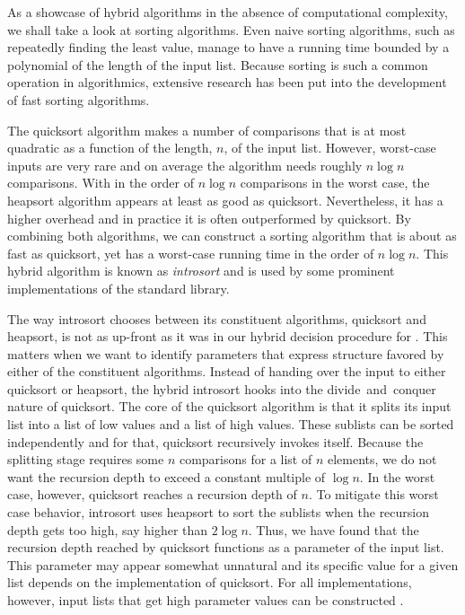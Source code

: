 \begin{example}
  As a showcase of hybrid algorithms in the absence of computational complexity, we shall take a look at sorting algorithms.
  Even naive sorting algorithms, such as repeatedly finding the least value, manage to have a running time bounded by a polynomial of the length of the input list.
  Because sorting is such a common operation in algorithmics, extensive research has been put into the development of fast sorting algorithms.

  The quicksort algorithm \parencite{cormen2009introduction} makes a number of comparisons that is at most quadratic as a function of the length, $n$, of the input list.
  However, worst-case inputs are very rare and on average the algorithm needs roughly $n \log n$ comparisons.
  With in the order of $n \log n$ comparisons in the worst case, the heapsort algorithm \parencite{cormen2009introduction} appears at least as good as quicksort.
  Nevertheless, it has a higher overhead and in practice it is often outperformed by quicksort.
  By combining both algorithms, we can construct a sorting algorithm that is about as fast as quicksort, yet has a worst-case running time in the order of $n \log n$.
  This hybrid algorithm is known as \emph{introsort} \parencite{musser1997introspective} and is used by some prominent implementations of the \Cpp{} standard library.

  The way introsort chooses between its constituent algorithms, quicksort and heapsort, is not as up-front as it was in our hybrid decision procedure for .
  This matters when we want to identify parameters that express structure favored by either of the constituent algorithms.
  Instead of handing over the input to either quicksort or heapsort, the hybrid introsort hooks into the divide~and~conquer nature of quicksort.
  The core of the quicksort algorithm is that it splits its input list into a list of low values and a list of high values.
  These sublists can be sorted independently and for that, quicksort recursively invokes itself.
  Because the splitting stage requires some $n$ comparisons for a list of $n$ elements, we do not want the recursion depth to exceed a constant multiple of $\log n$.
  In the worst case, however, quicksort reaches a recursion depth of $n$.
  To mitigate this worst case behavior, introsort uses heapsort to sort the sublists when the recursion depth gets too high, say higher than $2 \log n$.
  Thus, we have found that the recursion depth reached by quicksort functions as a parameter of the input list.
  This parameter may appear somewhat unnatural and its specific value for a given list depends on the implementation of quicksort.
  For all implementations, however, input lists that get high parameter values can be constructed \parencite{mcilroy1999killer}.


\end{example}
